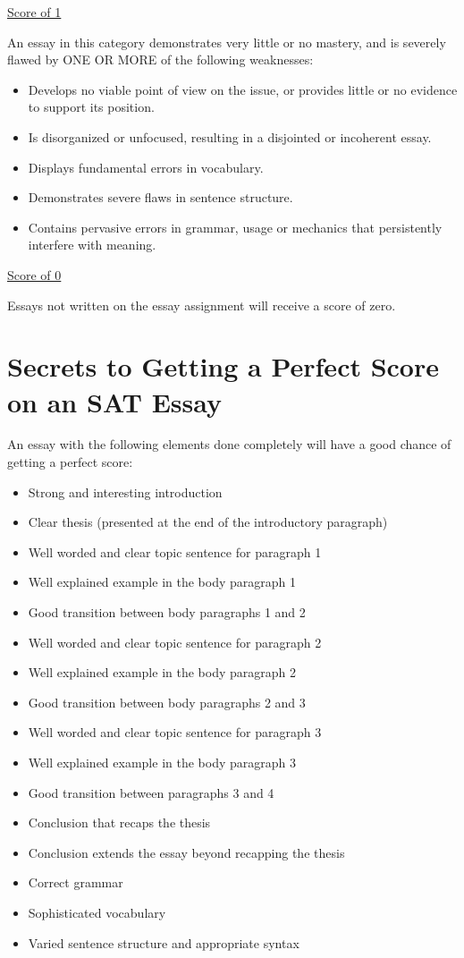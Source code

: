 \vfill
\underline{Score of 1}

An essay in this category demonstrates very little or no mastery, and is severely flawed by ONE OR MORE of the following weaknesses:

\begin{itemize}
\item{Develops no viable point of view on the issue, or provides little or no evidence to support its position.}
\item{Is disorganized or unfocused, resulting in a disjointed or incoherent essay.}
\item{Displays fundamental errors in vocabulary.}
\item{Demonstrates severe flaws in sentence structure.}
\item{Contains pervasive errors in grammar, usage or mechanics that persistently interfere with meaning.}
\end{itemize}

\bigskip
\underline{Score of 0}

Essays not written on the essay assignment will receive a score of zero.

\vfill
\newpage
\section[Getting A Perfect Score]{Secrets to Getting a Perfect Score on an SAT Essay}
An essay with the following elements done completely will have a good chance of getting a perfect score:

\bigskip
\begin{itemize}
\vfill\item Strong and interesting introduction
\vfill\item Clear thesis (presented at the end of the introductory paragraph)
\vfill\item Well worded and clear topic sentence for paragraph 1
\vfill\item Well explained example in the body paragraph 1
\vfill\item Good transition between body paragraphs 1 and 2
\vfill\item Well worded and clear topic sentence for paragraph 2
\vfill\item Well explained example in the body paragraph 2
\vfill\item Good transition between body paragraphs 2 and 3
\vfill\item Well worded and clear topic sentence for paragraph 3
\vfill\item Well explained example in the body paragraph 3
\vfill\item Good transition between paragraphs 3 and 4
\vfill\item Conclusion that recaps the thesis
\vfill\item Conclusion extends the essay beyond recapping the thesis
\vfill\item Correct grammar
\vfill\item Sophisticated vocabulary
\vfill\item Varied sentence structure and appropriate syntax
\end{itemize}
\vfill

